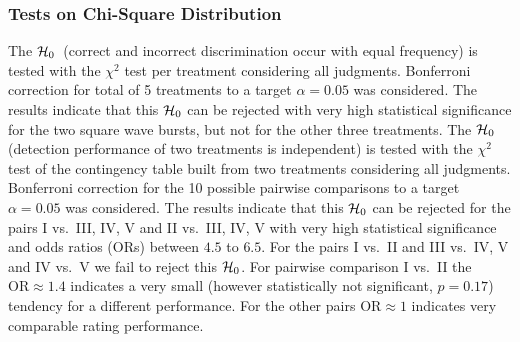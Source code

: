 \subsubsection{Tests on Chi-Square Distribution}
The $\mathcal{H}_{0}$~(correct and incorrect discrimination occur with equal
frequency) is tested with the $\chi^2$ test per treatment considering all judgments.
%
Bonferroni correction for total of 5 treatments to a target
$\alpha=0.05$ was considered.
%
The results indicate that this $\mathcal{H}_{0}$ can be rejected
with very high statistical significance for the two square wave bursts,
but not for the other three treatments.
%
\NewL The $\mathcal{H}_{0}$ (detection performance of two treatments is independent)
is tested with the $\chi^2$ test of the contingency table built from two treatments
considering all judgments.
%
Bonferroni correction for the 10 possible pairwise comparisons to a target
$\alpha=0.05$ was considered.
%
The results indicate that this $\mathcal{H}_{0}$ can be rejected for
the pairs I vs.~III, IV, V and II vs.~III, IV, V with very high statistical
significance and odds ratios (ORs) between $4.5$ to $6.5$.
%
For the pairs I vs.~II and III vs.~IV, V and IV vs.~V we fail to reject this
$\mathcal{H}_{0}$.
For pairwise comparison I vs.~II the $\text{OR}\approx 1.4$ indicates a very small
(however statistically not significant, $p=0.17$) tendency for a different performance.
%
For the other pairs $\text{OR}\approx 1$ indicates very comparable rating performance.
%
%
%
